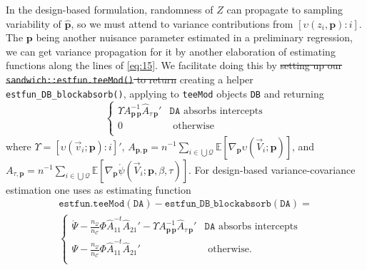 \documentclass{article}
\newcommand{\absorbInterceptsEF}{\upsilon}
\newcommand{\AbsorbInterceptsEF}{\Upsilon}
\begin{document}
In the design-based formulation, randomness of $Z$ can propagate to
sampling variability of $\hat{\mathbf{p}}$,  so we must attend to
variance contributions from $[\absorbInterceptsEF(z_{i}, \mathbf{p}): i]$. 
The $\mathbf{p}$ being another nuisance parameter estimated in a
preliminary regression, we can get variance propagation for it by
another elaboration of estimating functions along the lines of
\eqref{eq:15}. We facilitate doing
this by \st{setting up our
\texttt{sandwich::estfun.teeMod()} to return} creating a
helper \texttt{estfun\_DB\_blockabsorb()}, applying to
\texttt{teeMod} objects \texttt{DB} and returning
\begin{equation*}
\begin{cases}
  \AbsorbInterceptsEF{}
  A_{\mathbf{p}\,\mathbf{p}}^{-1}\hat{A}_{\tau\,\mathbf{p}}' &
  \mathtt{DA} \text{ absorbs intercepts}\\
0 & \text{ otherwise}\\
\end{cases}
\end{equation*}
where 
$\AbsorbInterceptsEF= [\absorbInterceptsEF(\vec{v}_{i}; \mathbf{p}): i]'$, 
$A_{\mathbf{p}, \mathbf{p}} = n^{-1}\sum_{i\in \bigcup
  \mathcal{Q}}\mathbb{E} [\nabla_{\mathbf{p}}\absorbInterceptsEF(\vec{V}_{i};
\mathbf{p})]$, and $A_{\tau, \mathbf{p}} = n^{-1} \sum_{i\in \bigcup
  \mathcal{Q}}\mathbb{E}[\nabla_{\mathbf{p}}\acute{\psi}(\vec{V}_{i};
\mathbf{p}, \beta, \tau)]$.  For design-based variance-covariance
estimation one uses as estimating function
\begin{multline*}\label{eq:25}
  \mathtt{estfun.teeMod(DA)} -
  \mathtt{estfun\_DB\_blockabsorb(DA)} =\\
\begin{cases}
\acute{\Psi} -
  \frac{n_{\mathcal{Q}}}{n_{\mathcal{C}}}\Phi
  \hat{A}_{11}^{-t}\hat{A}_{21}'  - \AbsorbInterceptsEF{}
  A_{\mathbf{p}\,\mathbf{p}}^{-1}\hat{A}_{\tau\,\mathbf{p}}' & \mathtt{DA} \text{ absorbs intercepts}\\
 \Psi -
  \frac{n_{\mathcal{Q}}}{n_{\mathcal{C}}}\Phi
  \hat{A}_{11}^{-t}\hat{A}_{21}' 
 & \text{ otherwise}.\\
\end{cases}
\end{multline*}
\end{document}
